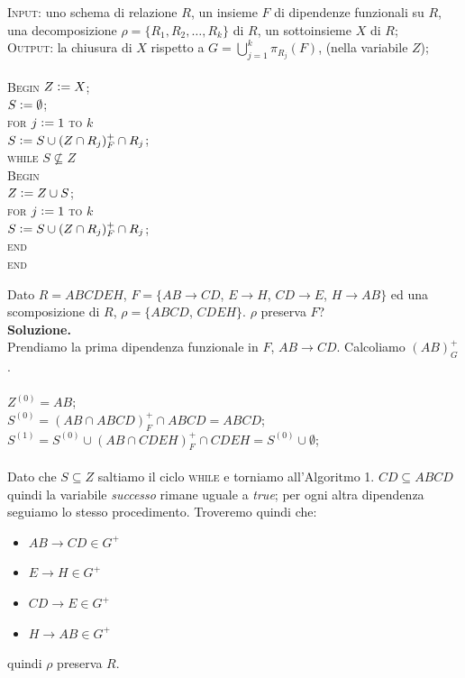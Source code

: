 \begin{alg}
\textsc{Input}: uno schema di relazione $R$, un insieme $F$ di dipendenze funzionali su $R$, una
decomposizione $\rho =\{R_1, R_2, \ldots, R_k\}$ di $R$, un sottoinsieme $X$ di $R$;\\
\textsc{Output}: la chiusura di $X$ rispetto a $G = \bigcup_{j=1}^k \pi_{R_j}(F)$, (nella variabile $Z$);\\\\
\textsc{Begin}
$Z\vcentcolon = X$;\\
$S\vcentcolon = \emptyset$;\\
\textsc{for} $j\vcentcolon = 1$ \textsc{to} $k$\\
\indent$S \vcentcolon= S \cup (Z \cap R_j)^{+}_F \cap R_j$;\\
\textsc{while} $S \not\subseteq Z$\\
\indent \textsc{Begin}\\
\indent $Z\vcentcolon = Z \cup S$;\\
\indent \textsc{for} $j\vcentcolon= 1$ \textsc{to} $k$\\
\indent \indent $S\vcentcolon= S \cup (Z \cap R_j)^{+}_F \cap R_j$;\\
\indent \textsc{end}\\
\textsc{end}\\
\end{alg}
\begin{exmp}
Dato $R=ABCDEH$, $F=\{AB\rightarrow CD$, $E \rightarrow H$, $CD\rightarrow E$, $H\rightarrow AB\}$ ed una scomposizione
di $R$, $\rho=\{ABCD$, $CDEH\}$. $\rho$ preserva $F$?\\

\noindent \textbf{Soluzione.}\\
Prendiamo la prima dipendenza funzionale in $F$, $AB\rightarrow CD$. Calcoliamo $(AB)^+_G$.\\\\
$Z^{(0)}= AB$;\\
$S^{(0)} = (AB \cap ABCD)^+_F \cap ABCD = ABCD$;\\
$S^{(1)} = S^{(0)} \cup (AB \cap CDEH)^+_F \cap CDEH = S^{(0)} \cup \emptyset$;\\\\
Dato che $S\subseteq Z$ saltiamo il ciclo \textsc{while} e torniamo all'Algoritmo 1. $CD \subseteq ABCD$ 
quindi la variabile \emph{successo} rimane uguale a \emph{true}; per ogni altra dipendenza seguiamo lo
stesso procedimento. Troveremo quindi che:
\begin{itemize}
 \item $AB\rightarrow CD \in G^+$
 \item $E \rightarrow H  \in G^+$
 \item $CD\rightarrow E \in G^+$
 \item $H\rightarrow AB  \in G^+$
\end{itemize}
quindi $\rho$ preserva $R$.
\end{exmp}

